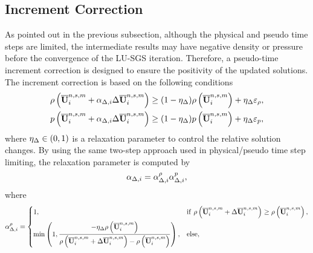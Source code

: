 \subsection{Increment Correction}
\label{ssec:increment-correction}

As pointed out in the previous subsection, although the physical and pseudo time steps are limited,
the intermediate results may have negative density or pressure before the convergence of the LU-SGS iteration.
Therefore, a pseudo-time increment correction is designed to ensure the positivity of the updated solutions.
The increment correction is based on the following conditions
\begin{equation}
    \label{eq:ppLimitInc}
    \begin{aligned}
        \rho\left(\overline{\mathbf{U}}_i^{n,s,m} + \alpha_{\mathrm\Delta,i} \mathrm\Delta \overline{\mathbf{U}}_i^{n,s,m}\right)
         & \geq
        (1- \eta_\mathrm\Delta)
        \rho\left(\overline{\mathbf{U}}_i^{n,s,m}\right)
        + \eta_\mathrm\Delta \varepsilon_\rho, \\
        p\left(\overline{\mathbf{U}}_i^{n,s,m} + \alpha_{\mathrm\Delta,i} \mathrm\Delta \overline{\mathbf{U}}_i^{n,s,m}\right)
         & \geq
        (1- \eta_\mathrm\Delta)
        p\left(\overline{\mathbf{U}}_i^{n,s,m}\right)
        + \eta_\mathrm\Delta \varepsilon_p,
    \end{aligned}
\end{equation}
where $\eta_\mathrm\Delta \in (0,1)$ is a relaxation parameter to control the relative solution changes.
By using the same two-step approach used in physical/pseudo time step limiting, the relaxation parameter is computed by
\begin{equation}
    \alpha_{\mathrm\Delta,i}= \alpha_{\mathrm\Delta,i}^{\rho} \alpha_{\mathrm\Delta,i}^{p},
\end{equation}
where
\begin{equation}
    \alpha_{\mathrm\Delta,i}^{\rho} = \begin{dcases}
        1,                                                                                                                                                             & \mathrm{if} \ \rho\left(\overline{\mathbf{U}}^{n,s,m}_i +\mathrm\Delta \overline{\mathbf{U}}_i^{n,s,m}\right) \geq  \rho\left(\overline{\mathbf{U}}^{n,s,m}_i\right), \\
        \min\left(1, \dfrac{-\eta_\mathrm\Delta \rho\left(\overline{\mathbf{U}}^{n,s,m}_i\right)}{\rho \left(\overline{\mathbf{U}}^{n,s,m}_i +\mathrm\Delta \overline{\mathbf{U}}_i^{n,s,m} \right)-  \rho\left(\overline{\mathbf{U}}^{n,s,m}_i\right)} \right), &
        \mathrm{else},
    \end{dcases}
\end{equation}
